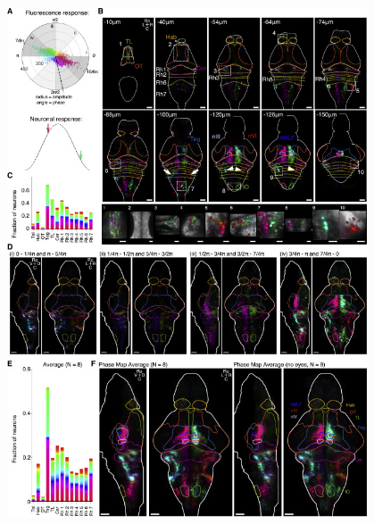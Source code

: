 \begin{figure}
\centering
\includegraphics[width=0.95\textwidth]{./files/Migault_et-al_Fig4.jpg}
\caption{\label{FIGMigault4}} 
\end{figure}

